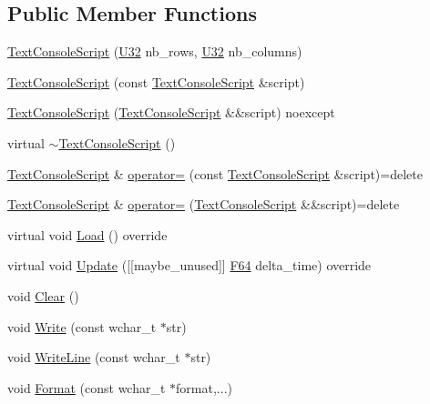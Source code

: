 \subsection*{Public Member Functions}
\begin{DoxyCompactItemize}
\item 
\hyperlink{classmage_1_1script_1_1_text_console_script_a5b26c235c08fb2e443ce3f728985a41e}{Text\+Console\+Script} (\hyperlink{namespacemage_a41c104c036fba3756a74e19f793eeaa1}{U32} nb\+\_\+rows, \hyperlink{namespacemage_a41c104c036fba3756a74e19f793eeaa1}{U32} nb\+\_\+columns)
\item 
\hyperlink{classmage_1_1script_1_1_text_console_script_a82c8a2c15aa51befbfe6341e463057db}{Text\+Console\+Script} (const \hyperlink{classmage_1_1script_1_1_text_console_script}{Text\+Console\+Script} \&script)
\item 
\hyperlink{classmage_1_1script_1_1_text_console_script_a46052af67069fef12a8ff9de75cce382}{Text\+Console\+Script} (\hyperlink{classmage_1_1script_1_1_text_console_script}{Text\+Console\+Script} \&\&script) noexcept
\item 
virtual \hyperlink{classmage_1_1script_1_1_text_console_script_af0959c8a4f21bb4f9b5553dffc5710b9}{$\sim$\+Text\+Console\+Script} ()
\item 
\hyperlink{classmage_1_1script_1_1_text_console_script}{Text\+Console\+Script} \& \hyperlink{classmage_1_1script_1_1_text_console_script_a68af2a144f641c9813b333544fe3562a}{operator=} (const \hyperlink{classmage_1_1script_1_1_text_console_script}{Text\+Console\+Script} \&script)=delete
\item 
\hyperlink{classmage_1_1script_1_1_text_console_script}{Text\+Console\+Script} \& \hyperlink{classmage_1_1script_1_1_text_console_script_ae8560dece8d507ee338dda68e3176fed}{operator=} (\hyperlink{classmage_1_1script_1_1_text_console_script}{Text\+Console\+Script} \&\&script)=delete
\item 
virtual void \hyperlink{classmage_1_1script_1_1_text_console_script_aaa7ab7c1859adc6532b6191c205d44ef}{Load} () override
\item 
virtual void \hyperlink{classmage_1_1script_1_1_text_console_script_afc3d3099761c9c96b1a87ca07f06ddec}{Update} (\mbox{[}\mbox{[}maybe\+\_\+unused\mbox{]}\mbox{]} \hyperlink{namespacemage_ad26233bbec640deda836e572c1a23708}{F64} delta\+\_\+time) override
\item 
void \hyperlink{classmage_1_1script_1_1_text_console_script_a274764deea9f02ec77515680456548d6}{Clear} ()
\item 
void \hyperlink{classmage_1_1script_1_1_text_console_script_a210034f6226856e44d25c7796c3a2db9}{Write} (const wchar\+\_\+t $\ast$str)
\item 
void \hyperlink{classmage_1_1script_1_1_text_console_script_a5eac390dafa0570785e7a936df0ca0ce}{Write\+Line} (const wchar\+\_\+t $\ast$str)
\item 
void \hyperlink{classmage_1_1script_1_1_text_console_script_a4c956a26976c553a20b4c3b1ec5e9e6b}{Format} (const wchar\+\_\+t $\ast$format,...)
\end{DoxyCompactItemize}
